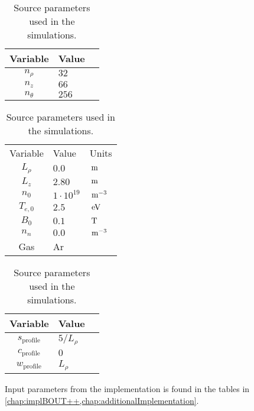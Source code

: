 \begin{table}[!htb]
    \begin{minipage}{.3\linewidth}
      \caption{Grid size used for the simulations.}
      \centering
        \begin{tabular}{c|ll}
        \hline\hline
        Variable & Value \\
        \hline
        $n_\rho$   & $32$  \\
        $n_z$      & $66$  \\
        $n_\theta$ & $256$ \\
        \hline\hline
        \end{tabular}
    \end{minipage}%
    \hfill
    \begin{minipage}{.3\linewidth}
      \centering
        \caption{Standard parameters used in the simulations.}
            \begin{tabular}{c|ll}
            \hline\hline
            Variable & Value & Units\\
            $L_\rho$  & $0.0$            & $\, \text{m}$     \\
            $L_z$     & $2.80$           & $ \, \text{m}$    \\
            $n_0$     & $1\cdot 10^{19}$ & $\, \text{m}^{-3}$\\
            $T_{e,0}$ & $2.5$            & $\, \text{eV}$    \\
            $B_0$     & $0.1$            & $\, \text{T}$     \\
            $n_n$     & $0.0$            & $\, \text{m}^{-3}$\\
            Gas       & Ar               &          \\
            \hline\hline
            \end{tabular}
    \end{minipage}
    \hfill
    \begin{minipage}{.3\linewidth}
      \centering
        \caption{Source parameters used in the simulations.}
            \begin{tabular}{c|ll}
            \hline\hline
            Variable & Value \\
            \hline
            $s_{\text{profile}}$ & $5/L_\rho$\\
            $c_{\text{profile}}$ & $0$       \\
            $w_{\text{profile}}$ & $L_\rho$  \\
            \hline\hline
            \end{tabular}
    \end{minipage}
\end{table}
%
Input parameters from the implementation is found in the tables in \cref{chap:implBOUT++,chap:additionalImplementation}.

